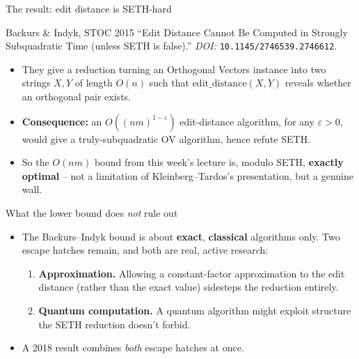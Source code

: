 \documentclass[11pt,aspectratio=169]{beamer}
\begin{document}
\begin{frame}{The result: edit distance is SETH-hard}
  \begin{block}{Backurs \& Indyk, STOC 2015}
    ``Edit Distance Cannot Be Computed in Strongly Subquadratic Time (unless SETH is
    false).'' \emph{DOI:} \texttt{10.1145/2746539.2746612}.
  \end{block}
  \begin{itemize}
    \item They give a reduction turning an Orthogonal Vectors instance into two strings
    $X, Y$ of length $O(n)$ such that $\mathrm{edit\_distance}(X,Y)$ reveals whether an
    orthogonal pair exists.
    \item \textbf{Consequence:} an $O((nm)^{1-\varepsilon})$ edit-distance algorithm, for
    any $\varepsilon>0$, would give a truly-subquadratic OV algorithm, hence refute SETH.
    \item So the $O(nm)$ bound from this week's lecture is, modulo SETH, \textbf{exactly
    optimal} -- not a limitation of Kleinberg--Tardos's presentation, but a genuine wall.
  \end{itemize}
\end{frame}

\begin{frame}{What the lower bound does \emph{not} rule out}
  \begin{itemize}
    \item The Backurs--Indyk bound is about \textbf{exact}, \textbf{classical}
    algorithms only. Two escape hatches remain, and both are real, active research:
    \begin{enumerate}
      \item \textbf{Approximation.} Allowing a constant-factor approximation to the edit
      distance (rather than the exact value) sidesteps the reduction entirely.
      \item \textbf{Quantum computation.} A quantum algorithm might exploit structure the
      SETH reduction doesn't forbid.
    \end{enumerate}
    \item A 2018 result combines \emph{both} escape hatches at once.
  \end{itemize}
\end{frame}
\end{document}
